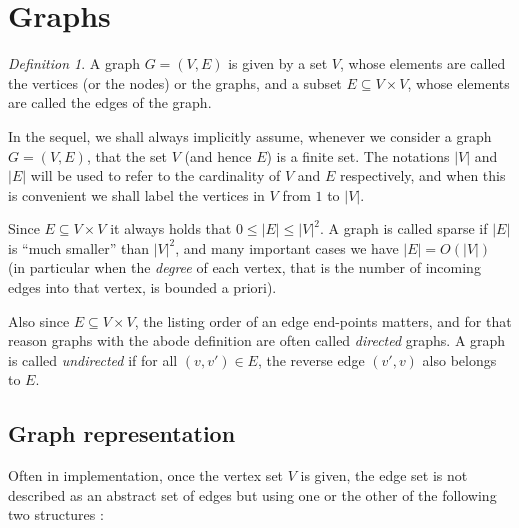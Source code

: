 \documentclass[12pt]{article}
\theoremstyle{plain}
\theoremstyle{remark}
\newtheorem*{definition}{Definition}
\begin{document}
\section{Graphs}

\begin{definition}A graph $G=(V,E)$ is given by a set $V$, whose elements are
called the vertices (or the nodes) or the graphs, and 
a subset $E \subseteq V \times V$, whose elements are called the edges of the
graph. \end{definition}

In the sequel, we shall always implicitly assume, whenever we consider a graph
$G=(V,E)$, that the set $V$ (and hence $E$) is a finite set. The notations $|V|$ 
and $|E|$ will be used to refer to the cardinality of $V$ and $E$ respectively, 
and when this is convenient we shall label the vertices in $V$ from $1$ to $|V|.$

Since $E \subseteq V \times V$ it always holds that $0 \leq |E| \leq |V|^2.$ 
A graph is called sparse if $|E|$ is ``much smaller'' than $|V|^2$, and many 
important cases we have $|E| = O(|V|)$ (in particular when the {\it degree}  
of each vertex, that is the number of incoming edges into that vertex, is
bounded a priori). 

\medskip

Also since $E \subseteq V \times V$, the listing order
of an edge end-points matters, and for that reason graphs with the
abode definition are often called {\it directed} graphs. A graph is called {\it
undirected} if for all $(v,v') \in E$, the reverse edge $(v',v)$ also belongs to
$E.$

\subsection{Graph representation}

Often in implementation, once the vertex set $V$ is given, the edge set is not 
described as an abstract set of edges but using one or the other 
of the following two structures : 

\medskip
\end{document}
